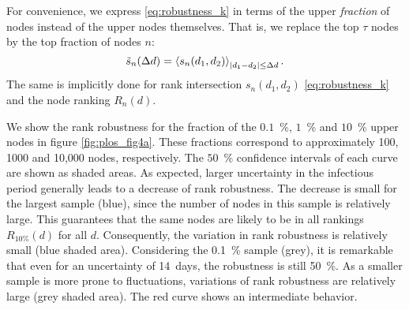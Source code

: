 For convenience, we express \eqref{eq:robustness_k} in terms of the upper \emph{fraction} of nodes instead of the upper nodes themselves.
That is, we replace the top $\tau $ nodes by the top fraction of nodes $n$:
\begin{equation}\label{eq:rank_robustness}
\tilde{s}_n (\Delta d)=\left< s_n (d_1,d_2) \right>_{\left| d_1-d_2 \right|\leq \Delta d} .
\end{equation}
The same is implicitly done for rank intersection $s_n(d_1,d_2)$ \eqref{eq:robustness_k} and the node ranking $R_n(d)$.

We show the rank robustness for the fraction of the $0.1$~\%, $1$~\% and $10$~\% upper nodes in figure \ref{fig:plos_fig4a}.
These fractions correspond to approximately 100, 1000 and 10,000 nodes, respectively.
The $50$~\% confidence intervals of each curve are shown as shaded areas.
As expected, larger uncertainty in the infectious period generally leads to a decrease of rank robustness.
The decrease is small for the largest sample (blue), since the number of nodes in this sample is relatively large.
This guarantees that the same nodes are likely to be in all rankings $R_{10\%}(d)$ for all $d$.  
Consequently, the variation in rank robustness is relatively small (blue shaded area).
Considering the 0.1~\% sample (grey), it is remarkable that even for an uncertainty of 14~days, the robustness is still 50~\%.
As a smaller sample is more prone to fluctuations, variations of rank robustness are relatively large (grey shaded area).
The red curve shows an intermediate behavior.

